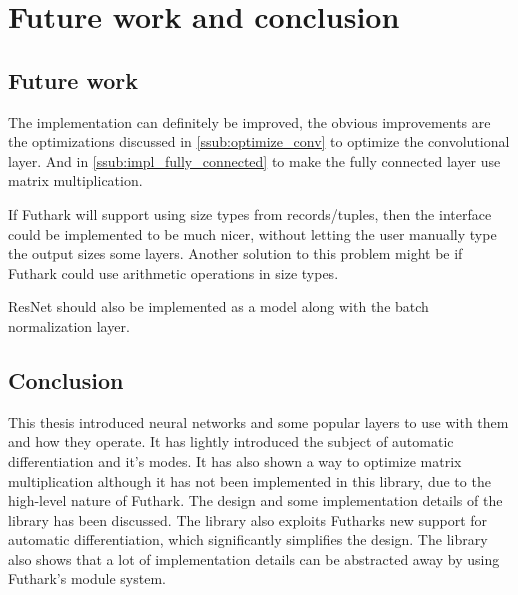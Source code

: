 \section{Future work and conclusion}
\subsection{Future work}
The implementation can definitely be improved, the obvious improvements are the optimizations discussed in \autoref{ssub:optimize_conv} to optimize the convolutional layer. And in \autoref{ssub:impl_fully_connected} to make the fully connected layer use matrix multiplication.

If Futhark will support using size types from records/tuples, then the interface could be implemented to be much nicer, without letting the user manually type the output sizes some layers.
Another solution to this problem might be if Futhark could use arithmetic operations in size types.

ResNet should also be implemented as a model along with the batch normalization layer.

\subsection{Conclusion}

This thesis introduced neural networks and some popular layers to use with them and how they operate.
It has lightly introduced the subject of automatic differentiation and it's modes.
It has also shown a way to optimize matrix multiplication although it has not been implemented in this library, due to the high-level nature of Futhark.
The design and some implementation details of the library has been discussed.
The library also exploits Futharks new support for automatic differentiation, which significantly simplifies the design.
The library also shows that a lot of implementation details can be abstracted away by using Futhark's module system.


